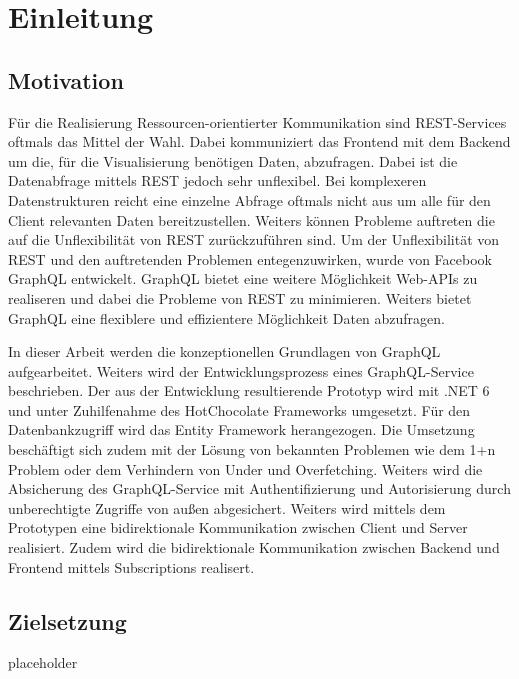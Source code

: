\chapter{Einleitung}

\section{Motivation}
Für die Realisierung Ressourcen-orientierter Kommunikation sind REST-Services oftmals das Mittel der Wahl.
Dabei kommuniziert das Frontend mit dem Backend um die, für die Visualisierung benötigen Daten, abzufragen.
Dabei ist die Datenabfrage mittels REST jedoch sehr unflexibel.
Bei komplexeren Datenstrukturen reicht eine einzelne Abfrage oftmals nicht aus um alle für den Client relevanten Daten bereitzustellen.
Weiters können Probleme auftreten die auf die Unflexibilität von REST zurückzuführen sind.
Um der Unflexibilität von REST und den auftretenden Problemen entegenzuwirken, wurde von Facebook GraphQL entwickelt.
GraphQL bietet eine weitere Möglichkeit Web-APIs zu realiseren und dabei die Probleme von REST zu minimieren.
Weiters bietet GraphQL eine flexiblere und effizientere Möglichkeit Daten abzufragen.
\newline

In dieser Arbeit werden die konzeptionellen Grundlagen von GraphQL aufgearbeitet.
Weiters wird der Entwicklungsprozess eines GraphQL-Service beschrieben.
Der aus der Entwicklung resultierende Prototyp wird mit .NET 6 und unter Zuhilfenahme des HotChocolate Frameworks umgesetzt.
Für den Datenbankzugriff wird das Entity Framework herangezogen.
Die Umsetzung beschäftigt sich zudem mit der Lösung von bekannten Problemen wie dem 1+n Problem oder dem Verhindern von Under und Overfetching.
Weiters wird die Absicherung des GraphQL-Service mit Authentifizierung und Autorisierung durch unberechtigte Zugriffe von außen abgesichert.
Weiters wird mittels dem Prototypen eine bidirektionale Kommunikation zwischen Client und Server realisiert. 
Zudem wird die bidirektionale Kommunikation zwischen Backend und Frontend mittels Subscriptions realisert.

\section{Zielsetzung}
placeholder
\pagebreak